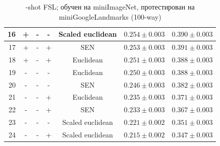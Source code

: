 \documentclass[a4paper, 12pt]{report}
\begin{document}
\begin{table}[h!]
\begin{adjustbox}{center}
\begin{tabular}{| r | c c c c | c |  c | }
    \hline
 16 & +               & -      & -      & Scaled euclidean & $0.254 \pm 0.003$ & $0.390 \pm 0.003$ \\
    \hline
 17 & +               & -      & +      & SEN              & $0.253 \pm 0.003$ & $0.391 \pm 0.003$ \\
    \hline
 18 & +               & -      & +      & Euclidean        & $0.251 \pm 0.003$ & $0.388 \pm 0.003$ \\
    \hline
 19 & -               & -      & -      & Euclidean        & $0.250 \pm 0.003$ & $0.388 \pm 0.003$ \\
    \hline
 20 & -               & -      & -      & SEN              & $0.246 \pm 0.003$ & $0.382 \pm 0.003$ \\
    \hline
 21 & -               & -      & +      & Euclidean        & $0.235 \pm 0.003$ & $0.371 \pm 0.003$ \\
    \hline
 22 & -               & -      & +      & SEN              & $0.233 \pm 0.003$ & $0.367 \pm 0.003$ \\
    \hline
 23 & -               & -      & -      & Scaled euclidean & $0.221 \pm 0.002$ & $0.351 \pm 0.003$ \\
    \hline
 24 & -               & -      & +      & Scaled euclidean & $0.215 \pm 0.002$ & $0.347 \pm 0.003$ \\
\hline
\end{tabular}
\end{adjustbox}
\caption{-shot FSL; обучен на miniImageNet, протестирован на miniGoogleLandmarks (100-way)}
\end{table}
\end{document}

